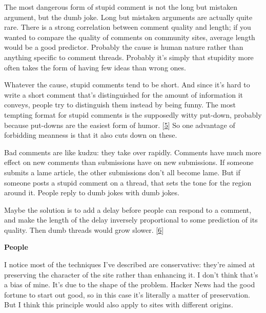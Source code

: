 The most dangerous form of stupid
                  comment is not the long but mistaken argument, but the dumb
                  joke. Long but mistaken arguments are actually quite rare.
                  There is a strong correlation between comment quality and
                  length; if you wanted to compare the quality of comments on
                  community sites, average length would be a good predictor.
                  Probably the cause is human nature rather than anything
                  specific to comment threads. Probably it's simply that
                  stupidity more often takes the form of having few ideas than
                  wrong ones.

Whatever the cause, stupid comments
                  tend to be short. And since it's hard to write a short comment
                  that's distinguished for the amount of information it conveys,
                  people try to distinguish them instead by being funny. The
                  most tempting format for stupid comments is the supposedly
                  witty put-down, probably because put-downs are the easiest
                  form of humor.
                  [\href{\#f5n}{5}]
                  So one advantage of forbidding meanness is that it also cuts
                  down on these.

Bad comments are like kudzu: they
                  take over rapidly. Comments have much more effect on new
                  comments than submissions have on new submissions. If someone
                  submits a lame article, the other submissions don't all become
                  lame. But if someone posts a stupid comment on a thread, that
                  sets the tone for the region around it. People reply to dumb
                  jokes with dumb jokes.

Maybe the solution is to add
                  a delay before people can respond to a comment, and make the
                  length of the delay inversely proportional to some prediction
                  of its quality. Then dumb threads would grow slower.
                  [\href{\#f6n}{6}]


                  \textbf{People}

I notice most of the techniques I've
                  described are conservative: they're aimed at preserving the
                  character of the site rather than enhancing it. I don't think
                  that's a bias of mine. It's due to the shape of the problem.
                  Hacker News had the good fortune to start out good, so in this
                  case it's literally a matter of preservation. But I think this
                  principle would also apply to sites with different origins.

